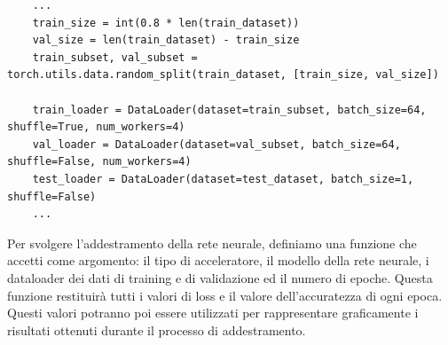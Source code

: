 \begin{lstlisting}
    ...
    train_size = int(0.8 * len(train_dataset))
    val_size = len(train_dataset) - train_size
    train_subset, val_subset = torch.utils.data.random_split(train_dataset, [train_size, val_size])

    train_loader = DataLoader(dataset=train_subset, batch_size=64, shuffle=True, num_workers=4)
    val_loader = DataLoader(dataset=val_subset, batch_size=64, shuffle=False, num_workers=4)
    test_loader = DataLoader(dataset=test_dataset, batch_size=1, shuffle=False)
    ...
\end{lstlisting}


Per svolgere l'addestramento della rete neurale, definiamo una funzione
che accetti come argomento: il tipo di acceleratore, il modello della 
rete neurale, i dataloader dei dati di training e di validazione ed il numero 
di epoche.
Questa funzione restituirà tutti i valori di loss e il valore 
dell'accuratezza di ogni epoca. Questi valori potranno poi essere utilizzati 
per rappresentare graficamente i risultati ottenuti durante il processo di addestramento.  


